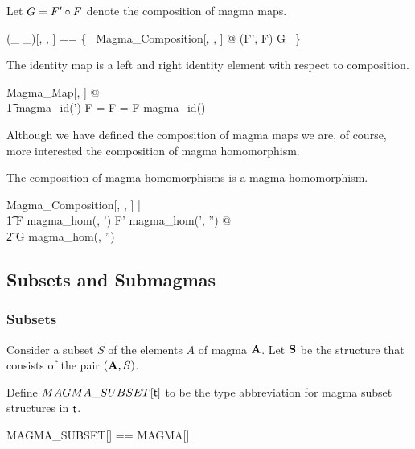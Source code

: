 \documentclass{amsart}
\begin{document}
Let $G = F' \mathbin{\circ} F$ denote the composition of magma maps.

\begin{zed}
	(\_ \compMagma \_)[\genT, \genU, \genV] == \{~ Magma\_Composition[\genT, \genU, \genV] @ (F', F) \mapsto G ~\}
\end{zed}

\begin{remark}
The identity map is a left and right identity element with respect to composition.

\begin{zed}
	\forall Magma\_Map[\setT, \setU] @ \\
	\t1 magma\_id(\strucA') \compMagma F = F = F \compMagma magma\_id(\strucA)
\end{zed}

\end{remark}

Although we have defined the composition of magma maps we are, of course, more interested
the composition of magma homomorphism.

\begin{remark}
The composition of magma homomorphisms is a magma homomorphism.

\begin{zed}
	\forall Magma\_Composition[\setT, \setU, \setV] | \\
	\t1	F \in magma\_hom(\strucA, \strucA') \land F' \in magma\_hom(\strucA', \strucA'') @ \\
	\t2		G \in magma\_hom(\strucA, \strucA'')
\end{zed}

\end{remark}

\subsection{Subsets and Submagmas}

\subsubsection{Subsets}

Consider a subset $S$ of the elements $A$ of magma $\mathbf{A}$.
Let $\mathbf{S}$ be the structure that consists of the pair $(\mathbf{A}, S)$.

Define $MAGMA\_SUBSET[\mathsf{t}]$ to be the type abbreviation for magma subset 
structures in $\mathsf{t}$.

\begin{zed}
	MAGMA\_SUBSET[\genT] == MAGMA[\genT] \cross \power \genT 
\end{zed}
\end{document}
